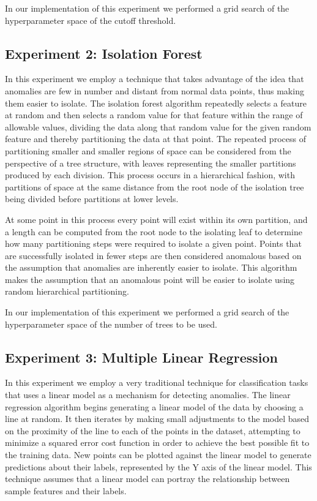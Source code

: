 \documentclass[conference]{IEEEtran}
\begin{document}
In our implementation of this experiment we performed a grid search of the hyperparameter space of the cutoff threshold.

\subsection*{Experiment 2: Isolation Forest}

In this experiment we employ a technique that takes advantage of the idea that anomalies are few in number and distant from normal data points, thus making them easier to isolate. The isolation forest algorithm repeatedly selects a feature at random and then selects a random value for that feature within the range of allowable values, dividing the data along that random value for the given random feature and thereby partitioning the data at that point. The repeated process of partitioning smaller and smaller regions of space can be considered from the perspective of a tree structure, with leaves representing the smaller partitions produced by each division. This process occurs in a hierarchical fashion, with partitions of space at the same distance from the root node of the isolation tree being divided before partitions at lower levels.

At some point in this process every point will exist within its own partition, and a length can be computed from the root node to the isolating leaf to determine how many partitioning steps were required to isolate a given point. Points that are successfully isolated in fewer steps are then considered anomalous based on the assumption that anomalies are inherently easier to isolate. This algorithm makes the assumption that an anomalous point will be easier to isolate using random hierarchical partitioning.

In our implementation of this experiment we performed a grid search of the hyperparameter space of the number of trees to be used.

\subsection*{Experiment 3: Multiple Linear Regression}

In this experiment we employ a very traditional technique for classification tasks that uses a linear model as a mechanism for detecting anomalies. The linear regression algorithm begins generating a linear model of the data by choosing a line at random. It then iterates by making small adjustments to the model based on the proximity of the line to each of the points in the dataset, attempting to minimize a squared error cost function in order to achieve the best possible fit to the training data. New points can be plotted against the linear model to generate predictions about their labels, represented by the Y axis of the linear model. This technique assumes that a linear model can portray the relationship between sample features and their labels.
\end{document}
